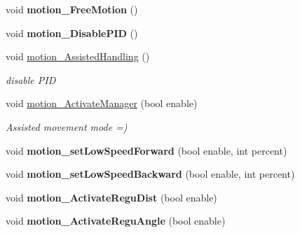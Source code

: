 \begin{DoxyCompactItemize}
\item 
\mbox{\label{classAsservDriver_aac603258c40d4c9aede0e5fce6ed4dea}} 
void {\bfseries motion\+\_\+\+Free\+Motion} ()
\item 
\mbox{\label{classAsservDriver_a0a68a702d1fea277c2e24e6dceb2d646}} 
void {\bfseries motion\+\_\+\+Disable\+P\+ID} ()
\item 
\mbox{\label{classAsservDriver_a733d0cddfdb612cea9e8097b348537f1}} 
void \hyperlink{classAsservDriver_a733d0cddfdb612cea9e8097b348537f1}{motion\+\_\+\+Assisted\+Handling} ()
\begin{DoxyCompactList}\small\item\em disable P\+ID \end{DoxyCompactList}\item 
\mbox{\label{classAsservDriver_aaeb3c80c8a079c812af38273f825c537}} 
void \hyperlink{classAsservDriver_aaeb3c80c8a079c812af38273f825c537}{motion\+\_\+\+Activate\+Manager} (bool enable)
\begin{DoxyCompactList}\small\item\em Assisted movement mode =) \end{DoxyCompactList}\item 
\mbox{\label{classAsservDriver_a17a6651fc8ecebafc085c46af984b099}} 
void {\bfseries motion\+\_\+set\+Low\+Speed\+Forward} (bool enable, int percent)
\item 
\mbox{\label{classAsservDriver_ac01272d7ef32443b3c283186041324c3}} 
void {\bfseries motion\+\_\+set\+Low\+Speed\+Backward} (bool enable, int percent)
\item 
\mbox{\label{classAsservDriver_a48e4f69bf857d6a18098dc48615a61f1}} 
void {\bfseries motion\+\_\+\+Activate\+Regu\+Dist} (bool enable)
\item 
\mbox{\label{classAsservDriver_a846608b8033f7d592d2540b68de72eeb}} 
void {\bfseries motion\+\_\+\+Activate\+Regu\+Angle} (bool enable)
\item 
\mbox{\label{classAsservDriver_acb84d282c7e0b40d9b326b0fcb7a0c69}} 

\end{DoxyCompactItemize}
